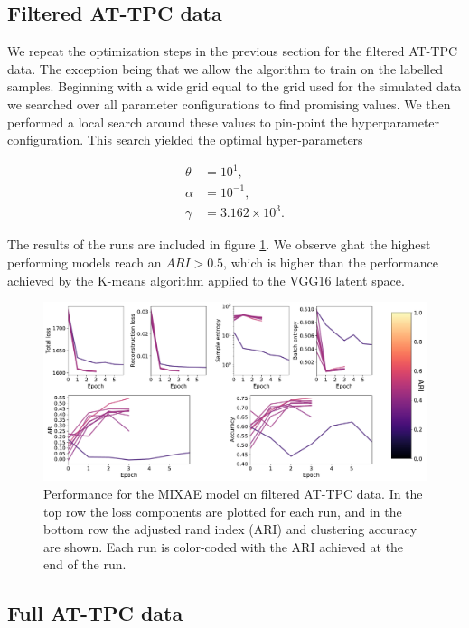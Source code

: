 \documentclass[preprint,12pt]{elsarticle}
\begin{document}
\subsection{Filtered AT-TPC data}

We repeat the optimization steps in the previous section for the filtered AT-TPC data. The exception being that we allow the algorithm to train on the labelled samples. Beginning with a wide grid equal to the grid used for the simulated data we searched over all parameter configurations to find promising values. We then performed a local search around these values to pin-point the hyperparameter configuration. This search yielded the optimal hyper-parameters 

\begin{align}
\theta &= 10^{1}, \\
\alpha &= 10^{-1}, \\
\gamma &= 3.162\times 10^3.
\end{align}

\noindent The results of the runs are included in figure \ref{fig:mixae_clean}. We observe ghat the highest performing models reach an $ARI > 0.5$, which is higher than the performance achieved by the K-means algorithm applied to the VGG16 latent space. 

\begin{figure}[H]
\centering
\includegraphics[width=\textwidth]{./plots/clean_mixae.pdf}
\caption[Clustering performance of MIXAE on filtered event AT-TPC data]{Performance for the MIXAE model on filtered AT-TPC data. In the top row the loss components are plotted for each run, and in the bottom row the adjusted rand index (ARI) and clustering accuracy are shown. Each run is color-coded with the ARI achieved at the end of the run.}\label{fig:mixae_clean}
\end{figure}


\subsection{Full AT-TPC data}
\end{document}
